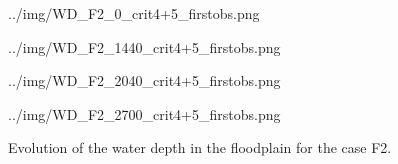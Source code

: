 \begin{figure}[H]
\begin{minipage}[t]{0.5\textwidth}
  \centering
  {../img/WD_F2_0_crit4+5_firstobs.png}
\end{minipage}
\begin{minipage}[t]{0.5\textwidth}
  \centering
  {../img/WD_F2_1440_crit4+5_firstobs.png}\\
\end{minipage}
\begin{minipage}[t]{0.5\textwidth}
  \centering
  {../img/WD_F2_2040_crit4+5_firstobs.png}\\
\end{minipage}
\begin{minipage}[t]{0.5\textwidth}
  \centering
  {../img/WD_F2_2700_crit4+5_firstobs.png}\\
\end{minipage}
  \caption{Evolution of the water depth in the floodplain for the case F2.}
  \label{fig:breach:WDF2_floodplain}
\end{figure}

